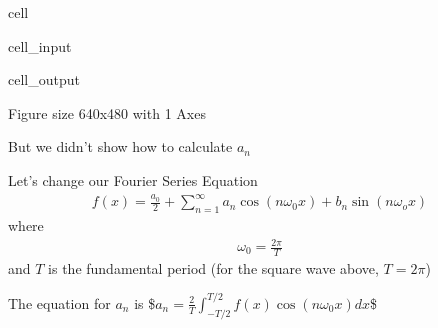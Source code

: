 \documentclass[letterpaper,10pt,english]{jupyterBook}
\begin{document}
\begin{sphinxuseclass}{cell}
\begin{sphinxVerbatimInput}
\begin{sphinxuseclass}{cell_input}
\end{sphinxuseclass}\end{sphinxVerbatimInput}
\begin{sphinxVerbatimOutput}

\begin{sphinxuseclass}{cell_output}
\begin{sphinxVerbatim}[commandchars=\\\{\}]
\PYGZlt{}Figure size 640x480 with 1 Axes\PYGZgt{}
\end{sphinxVerbatim}

\end{sphinxuseclass}\end{sphinxVerbatimOutput}

\end{sphinxuseclass}
\sphinxAtStartPar
But we didn’t show how to calculate \(a_n\)

\sphinxAtStartPar
Let’s change our Fourier Series Equation
\begin{equation*}
\begin{split}
f(x) = \frac{a_0}{2} + \sum_{n=1}^{\infty} a_n \cos(n \omega_0 x) + b_n \sin(n \omega_o x)
\end{split}
\end{equation*}
\sphinxAtStartPar
where
\begin{equation*}
\begin{split}
\omega_0 =\frac{2\pi}{T}
\end{split}
\end{equation*}
\sphinxAtStartPar
and \(T\) is the fundamental period (for the square wave above, \(T=2\pi\))

\sphinxAtStartPar
The equation for \(a_n\) is
\$\(
a_n = \frac{2}{T}\int_{-T/2}^{T/2} f(x)\cos(n \omega_0 x)dx
\)\$
\end{document}
